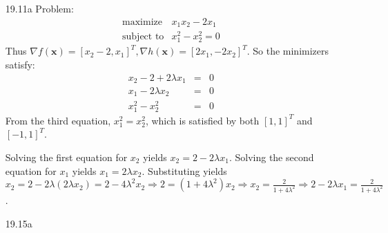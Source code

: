 \documentclass{article}
\begin{document}
\begin{itemize}
	\item[19.11a] Problem:
		\begin{displaymath}
			\begin{array}{rl}
				\textrm{maximize} & x_1 x_2 - 2x_1 \\
				\textrm{subject to} & x_1^2 - x_2^2 = 0
			\end{array}
		\end{displaymath}
		Thus $\nabla f(\boldsymbol{x}) = [x_2 - 2, x_1]^T, \nabla h(\boldsymbol{x}) = [2x_1, -2x_2]^T$. So the minimizers satisfy:
		\begin{eqnarray}
			x_2 - 2 + 2 \lambda x_1 & = & 0 \nonumber \\
			x_1 - 2 \lambda x_2 & = & 0 \nonumber \\
			x_1^2 - x_2^2 & = & 0 \nonumber
		\end{eqnarray}
		From the third equation, $x_1^2 = x_2^2$, which is satisfied by both $[1, 1]^T$ and $[-1, 1]^T$.
		
		Solving the first equation for $x_2$ yields $x_2 = 2 - 2 \lambda x_1$. Solving the second equation for $x_1$ yields $x_1 = 2 \lambda x_2$. Substituting yields $x_2 = 2 - 2 \lambda (2 \lambda x_2) = 2 - 4 \lambda^2 x_2 \Rightarrow 2 = (1 + 4 \lambda^2) x_2 \Rightarrow x_2 = \frac{2}{1 + 4 \lambda^2} \Rightarrow 2 - 2 \lambda x_1 = \frac{2}{1 + 4 \lambda^2}$.
	\item[19.15a]
\end{itemize}
\end{document}
